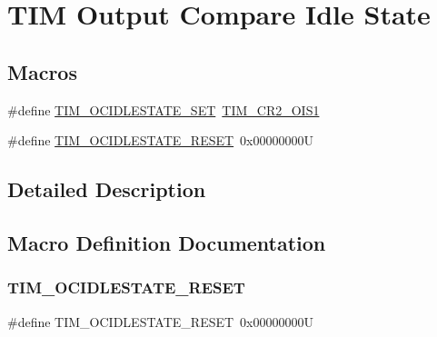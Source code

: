 \hypertarget{group___t_i_m___output___compare___idle___state}{}\section{T\+IM Output Compare Idle State}
\label{group___t_i_m___output___compare___idle___state}
\subsection*{Macros}
\begin{DoxyCompactItemize}
\item 
\#define \mbox{\hyperlink{group___t_i_m___output___compare___idle___state_gad251b83b0e33ddd0ed2fb35aa747ef78}{T\+I\+M\+\_\+\+O\+C\+I\+D\+L\+E\+S\+T\+A\+T\+E\+\_\+\+S\+ET}}~\mbox{\hyperlink{group___peripheral___registers___bits___definition_ga31b26bf058f88d771c33aff85ec89358}{T\+I\+M\+\_\+\+C\+R2\+\_\+\+O\+I\+S1}}
\item 
\#define \mbox{\hyperlink{group___t_i_m___output___compare___idle___state_ga56505fe4142096454f1da97683ce8bc2}{T\+I\+M\+\_\+\+O\+C\+I\+D\+L\+E\+S\+T\+A\+T\+E\+\_\+\+R\+E\+S\+ET}}~0x00000000U
\end{DoxyCompactItemize}


\subsection{Detailed Description}


\subsection{Macro Definition Documentation}
\mbox{\label{group___t_i_m___output___compare___idle___state_ga56505fe4142096454f1da97683ce8bc2}} 
\subsubsection{\texorpdfstring{TIM\_OCIDLESTATE\_RESET}{TIM\_OCIDLESTATE\_RESET}}
{\footnotesize\ttfamily \#define T\+I\+M\+\_\+\+O\+C\+I\+D\+L\+E\+S\+T\+A\+T\+E\+\_\+\+R\+E\+S\+ET~0x00000000U}


